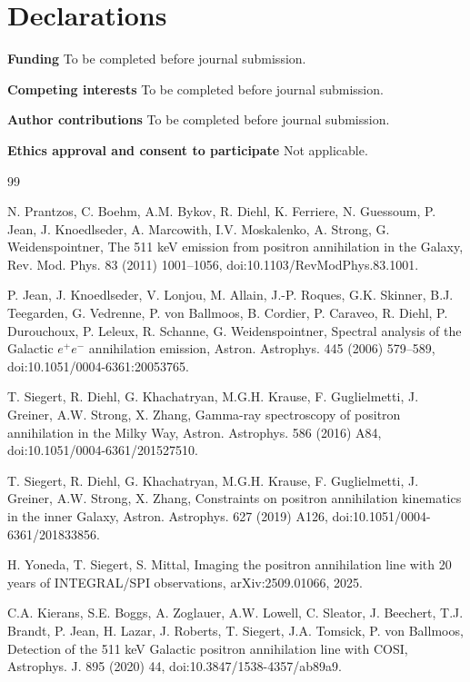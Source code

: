 \documentclass[11pt]{article}
\begin{document}
\section*{Declarations}
\textbf{Funding} To be completed before journal submission.

\textbf{Competing interests} To be completed before journal submission.

\textbf{Author contributions} To be completed before journal submission.

\textbf{Ethics approval and consent to participate} Not applicable.

\begin{thebibliography}{99}

N. Prantzos, C. Boehm, A.M. Bykov, R. Diehl, K. Ferriere, N. Guessoum, P. Jean, J. Knoedlseder, A. Marcowith, I.V. Moskalenko, A. Strong, G. Weidenspointner, The 511 keV emission from positron annihilation in the Galaxy, Rev. Mod. Phys. 83 (2011) 1001--1056, doi:10.1103/RevModPhys.83.1001.

P. Jean, J. Knoedlseder, V. Lonjou, M. Allain, J.-P. Roques, G.K. Skinner, B.J. Teegarden, G. Vedrenne, P. von Ballmoos, B. Cordier, P. Caraveo, R. Diehl, P. Durouchoux, P. Leleux, R. Schanne, G. Weidenspointner, Spectral analysis of the Galactic $e^+e^-$ annihilation emission, Astron. Astrophys. 445 (2006) 579--589, doi:10.1051/0004-6361:20053765.

T. Siegert, R. Diehl, G. Khachatryan, M.G.H. Krause, F. Guglielmetti, J. Greiner, A.W. Strong, X. Zhang, Gamma-ray spectroscopy of positron annihilation in the Milky Way, Astron. Astrophys. 586 (2016) A84, doi:10.1051/0004-6361/201527510.

T. Siegert, R. Diehl, G. Khachatryan, M.G.H. Krause, F. Guglielmetti, J. Greiner, A.W. Strong, X. Zhang, Constraints on positron annihilation kinematics in the inner Galaxy, Astron. Astrophys. 627 (2019) A126, doi:10.1051/0004-6361/201833856.

H. Yoneda, T. Siegert, S. Mittal, Imaging the positron annihilation line with 20 years of INTEGRAL/SPI observations, arXiv:2509.01066, 2025.

C.A. Kierans, S.E. Boggs, A. Zoglauer, A.W. Lowell, C. Sleator, J. Beechert, T.J. Brandt, P. Jean, H. Lazar, J. Roberts, T. Siegert, J.A. Tomsick, P. von Ballmoos, Detection of the 511 keV Galactic positron annihilation line with COSI, Astrophys. J. 895 (2020) 44, doi:10.3847/1538-4357/ab89a9.


\end{thebibliography}
\end{document}
